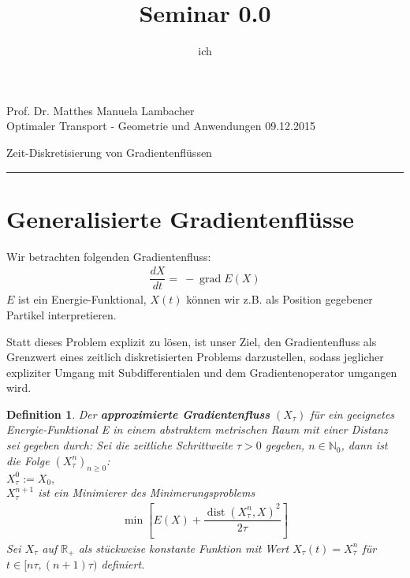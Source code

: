\documentclass[11pt,a4paper,notitlepage]{scrreprt}
\author{ich}
\title{Seminar 0.0}
\newcommand{\RR}{\mathbb{R}}
\newcommand{\NN}{\mathbb{N}}
\newcommand{\dist}{\operatorname{dist}}
\newcommand{\grad}{\operatorname{grad}}
\newtheorem{defi}{Definition}[section]
\begin{document}
\parindent 0pt



\pagestyle{plain}



 Prof. Dr. Matthes \hfill Manuela Lambacher\\
 Optimaler Transport - Geometrie und Anwendungen \hfill 09.12.2015
 \begin{center}
  {\huge{Zeit-Diskretisierung von Gradientenflüssen}} 
 \end{center}
 
 \hrule
 
\renewcommand{\thechapter}{\arabic{section}}
\renewcommand{\thesection}{\arabic{section}}
\section{Generalisierte Gradientenflüsse}

Wir betrachten folgenden Gradientenfluss:
\begin{eqnarray}
\dfrac{dX}{dt}=~-\grad E(X) \label{eq1}
\end{eqnarray}
$E$ ist ein Energie-Funktional, $X(t)$ können wir z.B. als Position gegebener Partikel interpretieren.\newline


Statt dieses Problem explizit zu lösen, ist unser Ziel, den Gradientenfluss als Grenzwert eines zeitlich diskretisierten Problems darzustellen, sodass jeglicher expliziter Umgang mit Subdifferentialen und dem Gradientenoperator umgangen wird.

\begin{defi}\label{approx}
Der \textbf{approximierte Gradientenfluss} $(X_\tau)$ für ein geeignetes Energie-Funktional E in einem abstraktem metrischen Raum mit einer Distanz sei gegeben durch:
\newline
Sei die zeitliche Schrittweite $\tau > 0$ gegeben, $n\in\NN_0$, dann ist die Folge $\left( X^n_\tau \right)_{n\geq 0}$:
\\
$X_\tau^0:=X_0,$
\\
$X_\tau^{n+1}$ ist ein Minimierer des Minimerungsproblems
\begin{eqnarray}
\min\left[E(X)+\dfrac{\dist(X_\tau^n,X)^2}{2\tau}\right] \label{Min}
\end{eqnarray}
Sei $X_\tau$ auf $\RR_+$ als stückweise konstante Funktion mit Wert $X_\tau(t)=X^n_\tau$ für $t\in [n\tau,(n+1)\tau)$ definiert.
\end{defi}
\end{document}
